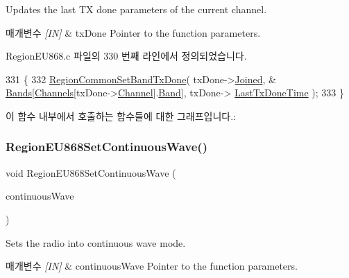 Updates the last TX done parameters of the current channel. 


\begin{DoxyParams}{매개변수}
{\em \mbox{[}\+I\+N\mbox{]}} & tx\+Done Pointer to the function parameters. \\
\hline
\end{DoxyParams}


Region\+E\+U868.\+c 파일의 330 번째 라인에서 정의되었습니다.


\begin{DoxyCode}
331 \{
332     \mbox{\hyperlink{group___r_e_g_i_o_n_c_o_m_m_o_n_ga491dea5590228a0cd33affd71743779c}{RegionCommonSetBandTxDone}}( txDone->\mbox{\hyperlink{structs_set_band_tx_done_params_ac2f6caa0f3b02d2ac5056c3ee7c22652}{Joined}}, &
      \mbox{\hyperlink{_region_e_u868_8c_a47eef5d43d561ee2fcab661437818ae3}{Bands}}[\mbox{\hyperlink{_region_e_u868_8c_a2f381382b4cbbe721da7b980ec467229}{Channels}}[txDone->\mbox{\hyperlink{structs_set_band_tx_done_params_a1ca6f01ca18afe402de51babe8c95f5e}{Channel}}].\mbox{\hyperlink{structs_channel_params_a724c03aa06953111c3291243831f251b}{Band}}], txDone->
      \mbox{\hyperlink{structs_set_band_tx_done_params_a7316dfb002c4e0015fceeb727020fe5c}{LastTxDoneTime}} );
333 \}
\end{DoxyCode}
이 함수 내부에서 호출하는 함수들에 대한 그래프입니다.\+:
\mbox{\label{group___r_e_g_i_o_n_e_u868_gaa7573d0677552b321af04417a58672eb}} 
\subsubsection{\texorpdfstring{Region\+E\+U868\+Set\+Continuous\+Wave()}{RegionEU868SetContinuousWave()}}
{\footnotesize\ttfamily void Region\+E\+U868\+Set\+Continuous\+Wave (\begin{DoxyParamCaption}\item[{\mbox{\hyperlink{group___r_e_g_i_o_n_gaf39bb5ba06921139c6d17f88a8d518cd}{Continuous\+Wave\+Params\+\_\+t}} $\ast$}]{continuous\+Wave }\end{DoxyParamCaption})}



Sets the radio into continuous wave mode. 


\begin{DoxyParams}{매개변수}
{\em \mbox{[}\+I\+N\mbox{]}} & continuous\+Wave Pointer to the function parameters. \\
\hline
\end{DoxyParams}



